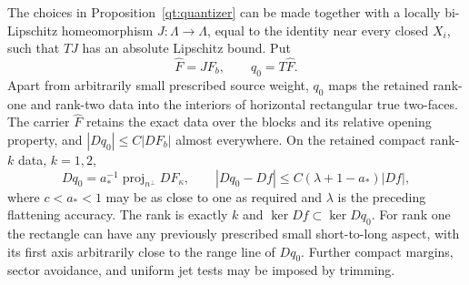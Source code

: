 \begin{lemma}\label{qt:calibration}
The choices in Proposition~\ref{qt:quantizer} can be made together
with a locally bi-Lipschitz homeomorphism
$J:\Lambda\to\Lambda$, equal to the identity near every closed $X_i$,
such that $TJ$ has an absolute Lipschitz bound.  Put
\[
 \widehat F=JF_b,\qquad q_0=T\widehat F.
\]
Apart from arbitrarily small prescribed source weight, $q_0$ maps the
retained rank-one and rank-two data into the interiors of horizontal
rectangular true two-faces.
The carrier $\widehat F$ retains the exact data over the blocks and its
relative opening property, and $|Dq_0|\leq C|DF_b|$ almost everywhere.
On the retained compact rank-$k$ data, $k=1,2$,
\begin{equation}\label{qt:calibrated-gradient}
 Dq_0=a_*^{-1}\operatorname{proj}_{n^\perp}DF_\kappa,
 \qquad |Dq_0-Df|\leq C(\lambda+1-a_*)|Df|,
\end{equation}
where $c<a_*<1$ may be as close to one as required and $\lambda$ is
the preceding flattening accuracy.  The rank is exactly $k$ and
$\ker Df\subset\ker Dq_0$.  For rank one the rectangle can have any
previously prescribed small short-to-long aspect, with its first axis
arbitrarily close to the range line of $Dq_0$.  Further compact margins,
sector avoidance, and uniform jet tests may be imposed by trimming.
\end{lemma}

